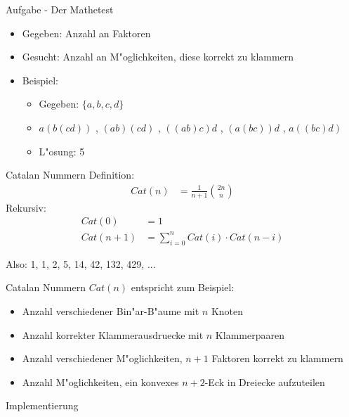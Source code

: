 \documentclass[18pt]{beamer}
\begin{document}
\begin{frame}{Aufgabe - Der Mathetest}
\begin{itemize}
\item Gegeben: Anzahl an Faktoren
\item Gesucht: Anzahl an M"oglichkeiten, diese korrekt zu klammern
\item Beispiel:
\begin{itemize}
\item Gegeben: $\lbrace a, b, c, d \rbrace$
\item $ a \left( b \left( c d \right) \right) $ , $\left( a b \right) \left( c d \right) $ , $\left( \left( a b \right) c \right) d$ , $\left( a \left( b  c \right) \right) d $ , $ a \left( \left( b  c \right) d \right) $
\item L"osung: 5
\end{itemize}
\end{itemize}
\end{frame}

\begin{frame}{Catalan Nummern}
Definition:
\begin{align*}
Cat \left( n \right) &= \frac{1}{n+1} \binom{2n}{n} 
\end{align*}
Rekursiv:
\begin{align*}
Cat \left( 0 \right) &= 1 \\
Cat \left( n + 1 \right) &= \sum_{i=0}^n Cat \left( i \right) \cdot Cat \left( n - i \right)
\end{align*}

Also: 1, 1, 2, 5, 14, 42, 132, 429, ...
\end{frame}

\begin{frame}{Catalan Nummern}
$Cat \left( n \right)$ entspricht zum Beispiel:
\begin{itemize}
\item Anzahl verschiedener Bin"ar-B"aume mit $n$ Knoten
\item Anzahl korrekter Klammerausdruecke mit $n$ Klammerpaaren
\item Anzahl verschiedener M"oglichkeiten, $n+1$ Faktoren korrekt zu klammern
\item Anzahl M"oglichkeiten, ein konvexes $n+2$-Eck in Dreiecke aufzuteilen
\end{itemize}
\end{frame}

\begin{frame} {Implementierung}
\end{frame}
\end{document}
